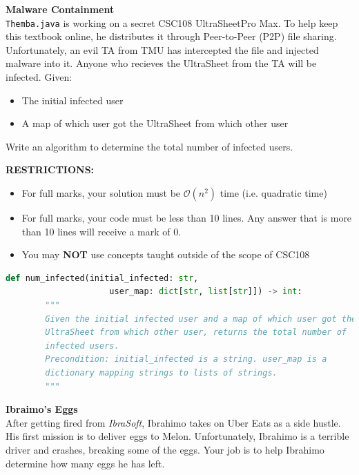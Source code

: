 \documentclass[letterpaper,12pt,addpoints]{exam}
\begin{document}
\begin{questions}
    \clearpage
    \question[10] \textbf{Malware Containment} \\
    \texttt{Themba.java} is working on a secret CSC108 UltraSheet\texttrademark  Pro Max. To help keep this textbook online, he distributes it through Peer-to-Peer (P2P) file sharing. Unfortunately, an evil TA from TMU has intercepted the file and injected malware into it. Anyone who recieves the UltraSheet from the TA will be infected. Given:
    \begin{itemize}
        \item The initial infected user
        \item A map of which user got the UltraSheet from which other user
    \end{itemize}
    Write an algorithm to determine the total number of infected users.
    \begin{center}
        \textbf{RESTRICTIONS:}
        \begin{itemize}
            \item For full marks, your solution must be $\mathcal{O}(n^2)$ time (i.e. quadratic
                  time)
            \item For full marks, your code must be less than 10 lines. Any answer that is more
                  than 10 lines will receive a mark of 0.
            \item You may \textbf{NOT} use concepts taught outside of the scope of CSC108
        \end{itemize}
    \end{center}
    \begin{lstlisting}[language=Python, style=mystyle]
    def num_infected(initial_infected: str, 
                     user_map: dict[str, list[str]]) -> int:
        """
        Given the initial infected user and a map of which user got the 
        UltraSheet from which other user, returns the total number of 
        infected users.
        Precondition: initial_infected is a string. user_map is a 
        dictionary mapping strings to lists of strings.
        """
    \end{lstlisting}
    \clearpage
    \question[10] \textbf{Ibraimo's Eggs} \\
    After getting fired from \textit{IbraSoft}, Ibrahimo takes on Uber Eats as a side hustle. His first mission is to deliver eggs to Melon. Unfortunately, Ibrahimo is a terrible driver and crashes, breaking some of the eggs. Your job is to help Ibrahimo determine how many eggs he has left. \\

\end{questions}
\end{document}
